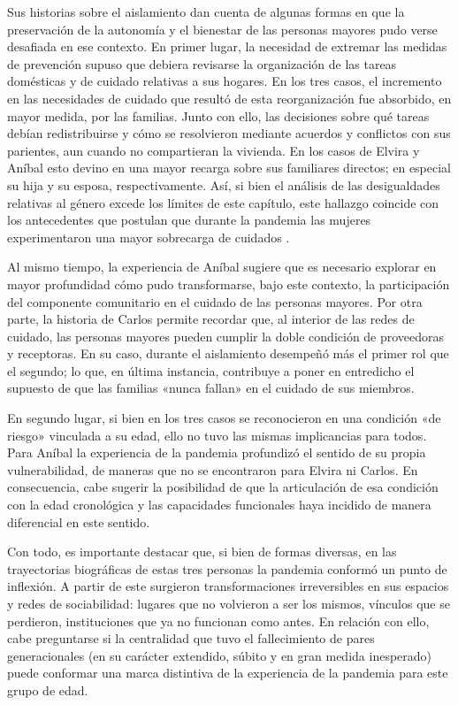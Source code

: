 \begin{refsection}
Sus historias sobre el aislamiento dan cuenta de algunas formas en que la preservación de la autonomía y el bienestar de las personas mayores pudo verse desafiada en ese contexto. En primer lugar, la necesidad de extremar las medidas de prevención supuso que debiera revisarse la organización de las tareas domésticas y de cuidado relativas a sus hogares. En los tres casos, el incremento en las necesidades de cuidado que resultó de esta reorganización fue absorbido, en mayor medida, por las familias. Junto con ello, las decisiones sobre qué tareas debían redistribuirse y cómo se resolvieron mediante acuerdos y conflictos con sus parientes, aun cuando no compartieran la vivienda. En los casos de Elvira y Aníbal esto devino en una mayor recarga sobre sus familiares directos; en especial su hija y su esposa, respectivamente. Así, si bien el análisis de las desigualdades relativas al género excede los límites de este capítulo, este hallazgo coincide con los antecedentes que postulan que durante la pandemia las mujeres experimentaron una mayor sobrecarga de cuidados \protect\parencite{4202-BONIOLO2024,4210-MOGUILLANSKY2024}.

Al mismo tiempo, la experiencia de Aníbal sugiere que es necesario explorar en mayor profundidad cómo pudo transformarse, bajo este contexto, la participación del componente comunitario en el cuidado de las personas mayores. Por otra parte, la historia de Carlos permite recordar que, al interior de las redes de cuidado, las personas mayores pueden cumplir la doble condición de proveedoras y receptoras. En su caso, durante el aislamiento desempeñó más el primer rol que el segundo; lo que, en última instancia, contribuye a poner en entredicho el supuesto de que las familias «nunca fallan» en el cuidado de sus miembros.

En segundo lugar, si bien en los tres casos se reconocieron en una condición «de riesgo» vinculada a su edad, ello no tuvo las mismas implicancias para todos. Para Aníbal la experiencia de la pandemia profundizó el sentido de su propia vulnerabilidad, de maneras que no se encontraron para Elvira ni Carlos. En consecuencia, cabe sugerir la posibilidad de que la articulación de esa condición con la edad cronológica y las capacidades funcionales haya incidido de manera diferencial en este sentido.

Con todo, es importante destacar que, si bien de formas diversas, en las trayectorias biográficas de estas tres personas la pandemia conformó un punto de inflexión. A partir de este surgieron transformaciones irreversibles en sus espacios y redes de sociabilidad: lugares que no volvieron a ser los mismos, vínculos que se perdieron, instituciones que ya no funcionan como antes. En relación con ello, cabe preguntarse si la centralidad que tuvo el fallecimiento de pares generacionales (en su carácter extendido, súbito y en gran medida inesperado) puede conformar una marca distintiva de la experiencia de la pandemia para este grupo de edad.


\end{refsection}
